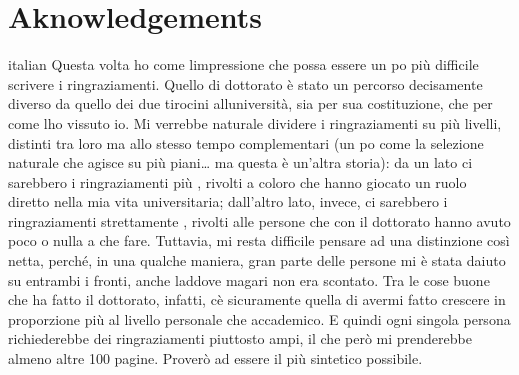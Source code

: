 
% 

{
\chapter*{Aknowledgements}
\label{aknowledgements}
}

\begin{otherlanguage*}{italian}
Questa volta ho come l\curlyapostrophe{}impressione che possa essere un po\curlyapostrophe{} più difficile scrivere i ringraziamenti. Quello di dottorato è stato un percorso decisamente diverso da quello dei due tirocini all\curlyapostrophe{}università, sia per sua costituzione, che per come l\curlyapostrophe{}ho vissuto io. Mi verrebbe naturale dividere i ringraziamenti su più livelli, distinti tra loro ma allo stesso tempo complementari (un po\curlyapostrophe{} come la selezione naturale che agisce su più piani\ldots{} ma questa è un'altra storia): da un lato ci sarebbero i ringraziamenti più , rivolti a coloro che hanno giocato un ruolo diretto nella mia vita universitaria; dall'altro lato, invece, ci sarebbero i ringraziamenti strettamente , rivolti alle persone che con il dottorato hanno avuto poco o nulla a che fare. Tuttavia, mi resta difficile pensare ad una distinzione così netta, perché, in una qualche maniera, gran parte delle persone mi è stata d\curlyapostrophe{}aiuto su entrambi i fronti, anche laddove magari non era scontato. Tra le cose buone che ha fatto il dottorato, infatti, c\curlyapostrophe{}è sicuramente quella di avermi fatto crescere in proporzione più al livello personale che accademico. E quindi ogni singola persona richiederebbe dei ringraziamenti piuttosto ampi, il che però mi prenderebbe almeno altre 100 pagine. Proverò ad essere il più sintetico possibile.



\end{otherlanguage*}

